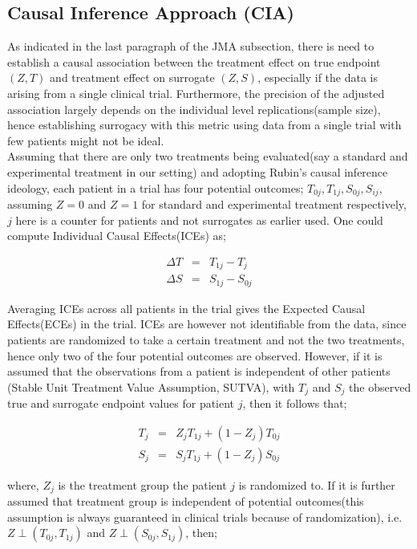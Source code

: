 \documentclass[a4paper,12pt]{article}
\begin{document}
	\subsection{Causal Inference Approach (CIA)}
	As indicated in the last paragraph of the JMA subsection, there is need to establish a causal association between the treatment effect on true endpoint $(Z,T)$ and treatment effect on surrogate $(Z,S)$, especially if the data is arising from a single clinical trial\cite{wim2016}. Furthermore, the precision of the adjusted association largely depends on the individual level replications(sample size), hence establishing surrogacy with this metric using data from a single trial with few patients might not be ideal\citep{wim2016,surrogate3}.\\
	
	Assuming that there are only two treatments being evaluated(say a standard and experimental treatment in our setting) and adopting Rubin's causal inference\citep{causal1} ideology, each patient in a trial has four potential outcomes; $T_{0j}, T_{1j}, S_{0j}, S_{ij}$, assuming $Z = 0$ and $Z = 1$ for standard and experimental treatment respectively, $j$ here is a counter for patients and not surrogates as earlier used. One could compute Individual Causal Effects(ICEs)\citep{surrogate3} as; 
	
	\begin{eqnarray}
	\Delta T &=&  T_{1j} - T_{j}\\
	\Delta S &=&  S_{1j} - S_{0j}
	\end{eqnarray}
	
	Averaging ICEs across all patients in the trial gives the Expected Causal Effects(ECEs) in the trial\citep{surrogate3}. ICEs are however not identifiable from the data, since patients are randomized to take a certain treatment and not the two treatments, hence only two of the four potential outcomes are observed\citep{surrogate1,surrogate3}. However, if it is assumed that the observations from a patient is independent of other patients (Stable Unit Treatment Value Assumption, SUTVA), with $T_j$ and $S_j$ the observed true and surrogate endpoint values for patient $j$, then it follows that;
	
	\begin{eqnarray}
	T_j &=& Z_jT_{1j} + (1 - Z_j)T_{0j}\\
	S_j &=& S_jT_{1j} + (1 - Z_j)S_{0j}
	\end{eqnarray}
	
	where, $Z_j$ is the treatment group the patient $j$ is randomized to. If it is further assumed that treatment group is independent of potential outcomes(this assumption is always guaranteed in clinical trials because of randomization), i.e. $Z \perp (T_{0j}, T_{1j})$ and $Z \perp (S_{0j}, S_{1j})$, then;
	
\end{document}
